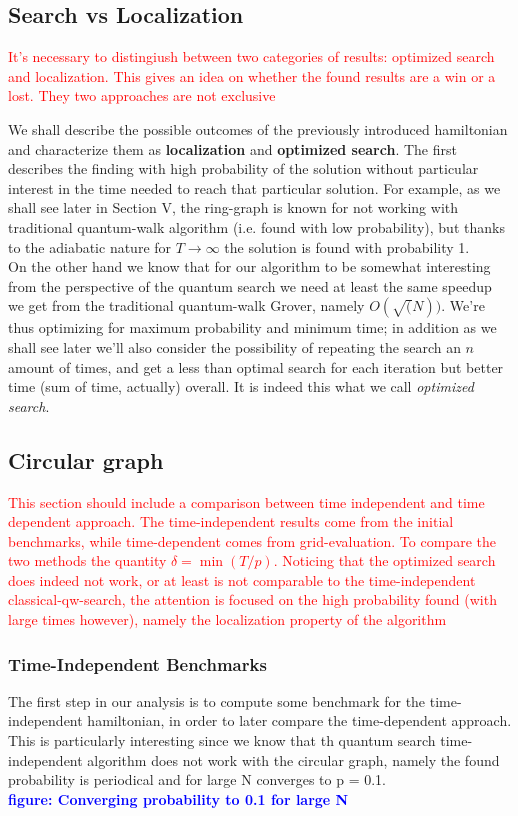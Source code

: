 \documentclass[aps,pra,reprint, onecolumn, showkeys]{revtex4-2}
\newcommand{\red}[1]{\textcolor{red}{#1}}
\newcommand{\blue}[1]{\textcolor{blue}{\textbf{figure: #1}}}
\begin{document}
\subsection{Search vs Localization}
\red{It's necessary to distingiush between two categories of results: optimized search and localization. This gives an idea on whether the found results are a win or a lost. They two approaches are not exclusive}

We shall describe the possible outcomes of the previously introduced hamiltonian and characterize them as \textbf{localization} and \textbf{optimized search}. The first describes the finding with high probability of the solution without particular interest in the time needed to reach that particular solution. For example, as we shall see later in Section V, the ring-graph is known for not working with traditional quantum-walk algorithm (i.e. found with low probability), but thanks to the adiabatic nature for $T \to \infty$ the solution is found with probability 1. \\

On the other hand we know that for our algorithm to be somewhat interesting from the perspective of the quantum search we need at least the same speedup we get from the traditional quantum-walk Grover, namely $O(\sqrt(N))$. We're thus optimizing for maximum probability and minimum time; in addition as we shall see later we'll also consider the possibility of repeating the search an $n$ amount of times, and get a less than optimal search for each iteration but better time (sum of time, actually) overall. It is indeed this what we call \textit{optimized search}.


\subsection{Circular graph}
\red{This section should include a comparison between time independent and time dependent approach. The time-independent results come from the initial benchmarks, while time-dependent comes from grid-evaluation. To compare the two methods the quantity $\delta = \min(T/p)$. Noticing that the optimized search does indeed not work, or at least is not comparable to the time-independent classical-qw-search, the attention is focused on the high probability found (with large times however), namely the localization property of the algorithm}\\

\subsubsection{Time-Independent Benchmarks}
The first step in our analysis is to compute some benchmark for the time-independent hamiltonian, in order to later compare the time-dependent approach. This is particularly interesting since we know that th quantum search time-independent algorithm does not work with the circular graph, namely the found probability is periodical and for large N converges to p = 0.1.\\ \blue{Converging probability to 0.1 for large N}\\
\end{document}
